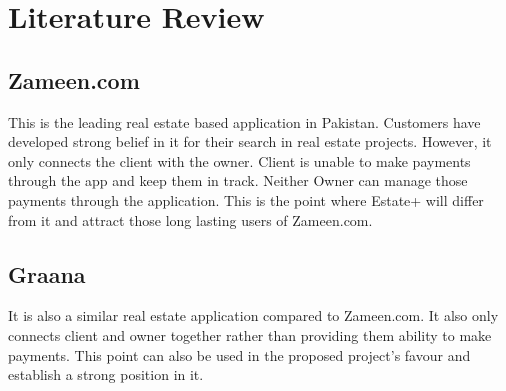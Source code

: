 \chapter{Literature Review} \label{chap:literatureReview}


\section*{}
\section{Zameen.com}
\cite{zameen} This is the leading real estate based application in Pakistan. Customers have developed strong belief in it for their search in real estate projects. However, it only connects the client with the owner. Client is unable to make payments through the app and keep them in track. Neither Owner can manage those payments through the application. This is the point where Estate+ will differ from it and attract those long lasting users of Zameen.com. \\[0.5cm]
\section{Graana}
\cite{graana} It is also a similar real estate application compared to Zameen.com. It also only connects client and owner together rather than providing them ability to make payments. This point can also be used in the proposed project's favour and establish a strong position in it.
